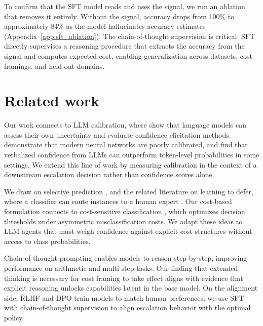 \documentclass{article}
\begin{document}
To confirm that the SFT model reads and uses the signal, we run an ablation that removes it entirely. Without the signal, accuracy drops from 100\% to approximately 84\% as the model hallucinates accuracy estimates (Appendix~\ref{app:sft_ablation}). The chain-of-thought supervision is critical: SFT directly supervises a reasoning procedure that extracts the accuracy from the signal and computes expected cost, enabling generalization across datasets, cost framings, and held-out domains.


\section{Related work}
\label{sec:related}

Our work connects to LLM calibration, where \citet{kadavath2022language} show that language models can assess their own uncertainty and \citet{xiong2024can} evaluate confidence elicitation methods. \citet{guo2017calibration} demonstrate that modern neural networks are poorly calibrated, and \citet{tian2023just} find that verbalized confidence from LLMs can outperform token-level probabilities in some settings. We extend this line of work by measuring calibration in the context of a downstream escalation decision rather than confidence scores alone.

We draw on selective prediction \citep{geifman2017selective}, and the related literature on learning to defer, where a classifier can route instances to a human expert \citep{madras2018predict, mozannar2020consistent}. Our cost-based formulation connects to cost-sensitive classification \citep{elkan2001foundations}, which optimizes decision thresholds under asymmetric misclassification costs. We adapt these ideas to LLM agents that must weigh confidence against explicit cost structures without access to class probabilities.

Chain-of-thought prompting \citep{wei2022chain} enables models to reason step-by-step, improving performance on arithmetic and multi-step tasks. Our finding that extended thinking is necessary for cost framing to take effect aligns with evidence that explicit reasoning unlocks capabilities latent in the base model. On the alignment side, RLHF \citep{ouyang2022training} and DPO \citep{rafailov2023direct} train models to match human preferences; we use SFT with chain-of-thought supervision to align escalation behavior with the optimal policy.
\end{document}
